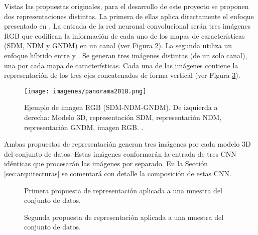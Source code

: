 Vistas las propuestas originales, para el desarrollo de este proyecto se proponen dos representaciones distintas. La primera de ellas aplica directamente el enfoque presentado en \cite{SFIKAS2018208}. La entrada de la red neuronal convolucional serán tres imágenes RGB que codifican la información de cada uno de los mapas de características (SDM, NDM y GNDM) en un canal (ver Figura \ref{fig:panoramaXYZ}). La segunda utiliza un enfoque híbrido entre \cite{sfikas2017exploiting} y \cite{SFIKAS2018208}. Se generan tres imágenes distintas (de un solo canal), una por cada mapa de características. Cada una de las imágenes contiene la representación de los tres ejes concatenados de forma vertical (ver Figura \ref{fig:panoramaSDMNDMGNDM}).

\begin{figure}[ht!]
    \centering
    \texttt{[image: imagenes/panorama2018.png]}
    \caption[Ejemplo de imagen RGB (SDM-NDM-GNDM).]{Ejemplo de imagen RGB (SDM-NDM-GNDM). De izquierda a derecha: Modelo 3D, representación SDM, representación NDM, representación GNDM, imagen RGB. \cite{SFIKAS2018208}.}
    \label{fig:panorama2018}
\end{figure}

Ambas propuestas de representación generan tres imágenes por cada modelo 3D del conjunto de datos. Estas imágenes conformarán la entrada de tres CNN idénticas que procesarán las imágenes por separado. En la Sección \ref{sec:arquitecturas} se comentará con detalle la composición de estas CNN.

\begin{figure}[ht!]
    \centering
    \caption[Primera propuesta de representación.]{Primera propuesta de representación aplicada a una muestra del conjunto de datos.}
    \label{fig:panoramaXYZ}
\end{figure}

\newpage

\begin{figure}[ht!]
    \centering
    \caption[Segunda propuesta de representación.]{Segunda propuesta de representación aplicada a una muestra del conjunto de datos.}
    \label{fig:panoramaSDMNDMGNDM}
\end{figure}

